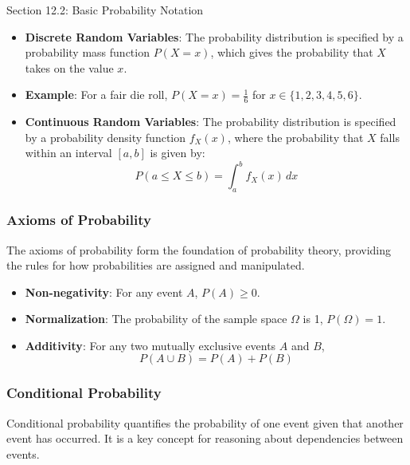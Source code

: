 \begin{notes}{Section 12.2: Basic Probability Notation}
\begin{highlight}
        \begin{itemize}
            \item \textbf{Discrete Random Variables}: The probability distribution is specified by a probability mass function $P(X = x)$, which gives the probability that $X$ takes on the value $x$.
            \item \textbf{Example}: For a fair die roll, $P(X = x) = \frac{1}{6}$ for $x \in \{1, 2, 3, 4, 5, 6\}$.
            \item \textbf{Continuous Random Variables}: The probability distribution is specified by a probability density function $f_X(x)$, where the probability that $X$ falls within an interval $[a, b]$ is given by:
            \[
            P(a \leq X \leq b) = \int_a^b f_X(x) \, dx
            \]
        \end{itemize}
    
    \end{highlight}
    
    \subsubsection*{Axioms of Probability}
    
    The axioms of probability form the foundation of probability theory, providing the rules for how probabilities are assigned and manipulated.
    
    \begin{highlight}
    
        \begin{itemize}
            \item \textbf{Non-negativity}: For any event $A$, $P(A) \geq 0$.
            \item \textbf{Normalization}: The probability of the sample space $\Omega$ is 1, $P(\Omega) = 1$.
            \item \textbf{Additivity}: For any two mutually exclusive events $A$ and $B$,
            \[
            P(A \cup B) = P(A) + P(B)
            \]
        \end{itemize}
    
    \end{highlight}
    
    \subsubsection*{Conditional Probability}
    
    Conditional probability quantifies the probability of one event given that another event has occurred. It is a key concept for reasoning about dependencies between events.
    

\end{notes}
